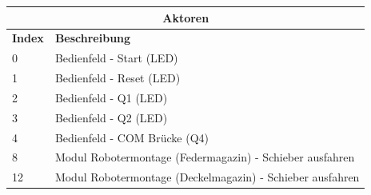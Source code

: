 \documentclass{article}
\begin{document}
\begin{center}
	\setlength\extrarowheight{4pt}
	\small
	\begin{tabularx}{\textwidth}{|p{1cm}|X|}
		\hline

		\multicolumn{2}{|c|}{\bf \color{black} \large Aktoren}\\
		\hline\hline

		\bf Index & \bf Beschreibung\\
		\hline\hline
		0 & Bedienfeld - Start (LED)\\
		\hline
		1 & Bedienfeld - Reset (LED)\\
		\hline
		2 & Bedienfeld - Q1 (LED)\\
		\hline
		3 & Bedienfeld - Q2 (LED)\\
		\hline
		4 & Bedienfeld - COM Brücke (Q4)\\
		\hline
		8 & Modul Robotermontage (Federmagazin) - Schieber ausfahren\\
		\hline
		12 & Modul Robotermontage (Deckelmagazin) - Schieber ausfahren\\
		\hline
	\end{tabularx}
	\label{tab:robot_actuator}
\end{center}
\newpage
\end{document}
